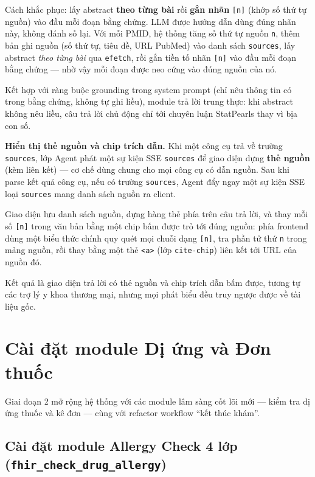 \documentclass[a4paper,13pt,3p,oneside]{report}
\theoremstyle{definition}
\theoremstyle{remark}
\theoremstyle{definition}
\begin{document}
Cách khắc phục: lấy abstract \textbf{theo từng bài} rồi \textbf{gắn nhãn} \texttt{[n]} (khớp số thứ tự nguồn) vào đầu mỗi đoạn bằng chứng. LLM được hướng dẫn dùng đúng nhãn này, không đánh số lại. Với mỗi PMID, hệ thống tăng số thứ tự nguồn \texttt{n}, thêm bản ghi nguồn (số thứ tự, tiêu đề, URL PubMed) vào danh sách \texttt{sources}, lấy abstract \textit{theo từng bài} qua \texttt{efetch}, rồi gắn tiền tố nhãn \texttt{[n]} vào đầu mỗi đoạn bằng chứng --- nhờ vậy mỗi đoạn được neo cứng vào đúng nguồn của nó.

Kết hợp với ràng buộc grounding trong system prompt (chỉ nêu thông tin có trong bằng chứng, không tự ghi liều), module trả lời trung thực: khi abstract không nêu liều, câu trả lời chủ động chỉ tới chuyên luận StatPearls thay vì bịa con số.

\textbf{Hiển thị thẻ nguồn và chip trích dẫn.} Khi một công cụ trả về trường \texttt{sources}, lớp Agent phát một sự kiện SSE \texttt{sources} để giao diện dựng \textbf{thẻ nguồn} (kèm liên kết) --- cơ chế dùng chung cho mọi công cụ có dẫn nguồn. Sau khi parse kết quả công cụ, nếu có trường \texttt{sources}, Agent đẩy ngay một sự kiện SSE loại \texttt{sources} mang danh sách nguồn ra client.

Giao diện lưu danh sách nguồn, dựng hàng thẻ phía trên câu trả lời, và thay mỗi số \texttt{[n]} trong văn bản bằng một chip bấm được trỏ tới đúng nguồn: phía frontend dùng một biểu thức chính quy quét mọi chuỗi dạng \texttt{[n]}, tra phần tử thứ \texttt{n} trong mảng nguồn, rồi thay bằng một thẻ \texttt{<a>} (lớp \texttt{cite-chip}) liên kết tới URL của nguồn đó.

Kết quả là giao diện trả lời có thẻ nguồn và chip trích dẫn bấm được, tương tự các trợ lý y khoa thương mại, nhưng mọi phát biểu đều truy ngược được về tài liệu gốc.

\section{Cài đặt module Dị ứng và Đơn thuốc}

Giai đoạn 2 mở rộng hệ thống với các module lâm sàng cốt lõi mới --- kiểm tra dị ứng thuốc và kê đơn --- cùng với refactor workflow ``kết thúc khám''.

\subsection{Cài đặt module Allergy Check 4 lớp (\texttt{fhir\_check\_drug\_allergy})}
\end{document}
